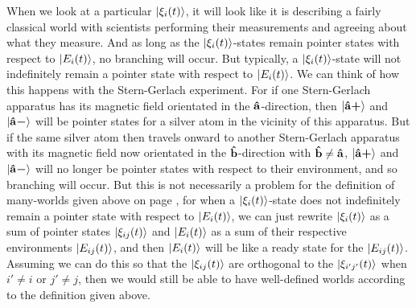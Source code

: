     When we look at a particular $\ket{\xi_i(t)}$, it will look like it is describing a fairly classical world with scientists performing their measurements and agreeing about what they measure. And as long as the $\ket{\xi_i(t)}$-states remain pointer states with respect to $\ket{E_i(t)}$, no branching will occur. But typically, a $\ket{\xi_i(t)}$-state will not indefinitely remain a pointer state with respect to $\ket{E_i(t)}$. We can think of how this happens with the Stern-Gerlach experiment. For if one Stern-Gerlach apparatus has its magnetic field orientated in the $\vb{\hat{{a}}}$-direction, then $\ket{{\vb{\hat{{a}}}\bm{+}}}$ and $\ket{{\vb{\hat{{a}}}\bm{-}}}$ will be pointer states for a silver atom in the vicinity of this apparatus. But if the same silver atom then travels onward to another Stern-Gerlach apparatus with its magnetic field now orientated in the $\vb{\hat{{b}}}$-direction with $\vb{\hat{{b}}}\neq\vb{\hat{{a}}}$, $\ket{{\vb{\hat{{a}}}\bm{+}}}$ and $\ket{{\vb{\hat{{a}}}\bm{-}}}$ will no longer be pointer states with respect to their environment, and so branching will occur. But this is not necessarily a problem for the definition of many-worlds given above on page \pageref{rigorousworld}, for when a $\ket{\xi_i(t)}$-state does not indefinitely remain a pointer state with respect to $\ket{E_i(t)}$, we can just rewrite $\ket{\xi_i(t)}$ as a sum of pointer states $\ket{\xi_{ij}(t)}$ and $\ket{E_i(t)}$  as a sum of their respective environments $\ket{E_{ij}(t)}$, and then $\ket{E_i(t)}$ will be like a ready state for the $\ket{E_{ij}(t)}$. Assuming we can do this so that the $\ket{\xi_{ij}(t)}$ are orthogonal to the $\ket{\xi_{i'j'}(t)}$ when $i'\neq i$ or $j'\neq j$, then we would still be able to have well-defined worlds according to the definition given above. 




   